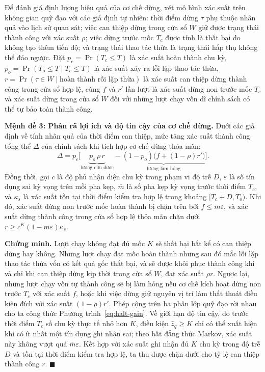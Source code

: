 Để đánh giá định lượng hiệu quả của cơ chế dừng, xét mô hình xác suất trên không gian quỹ đạo với các giả định tự nhiên: thời điểm dừng $\tau$ phụ thuộc nhân quả vào lịch sử quan sát; việc can thiệp dừng trong cửa sổ $W$ giữ được trạng thái thành công với xác suất $\rho$; việc dừng trước mốc $T_c$ được tính là thất bại do không tạo thêm tiến độ; và trạng thái thao tác thừa là trạng thái hấp thụ không thể đảo ngược. Đặt $p_c = \Pr(T_c \le T)$ là xác suất hoàn thành chu kỳ, $p_o = \Pr(T_o \le T \mid T_c \le T)$ là xác suất xảy ra lỗi lặp thao tác thừa, $r = \Pr(\tau \in W \mid \text{hoàn thành rồi lặp thừa})$ là xác suất can thiệp dừng thành công trong cửa sổ hợp lệ, cùng $f$ và $r'$ lần lượt là xác suất dừng non trước mốc $T_c$ và xác suất dừng trong cửa sổ $W$ đối với những lượt chạy vốn dĩ chính sách có thể tự bảo toàn thành công.

\textbf{Mệnh đề 3: Phân rã lợi ích và độ tin cậy của cơ chế dừng.} Dưới các giả định về tính nhân quả của thời điểm can thiệp, mức tăng xác suất thành công tổng thể $\Delta$ của chính sách khi tích hợp cơ chế dừng thỏa mãn:
\begin{equation}
\Delta = p_c \Big[ \underbrace{p_o\,\rho\,r}_{\text{lượng cứu được}} - \underbrace{(1 - p_o)\big(f + (1 - \rho)r'\big)}_{\text{lượng làm hỏng}} \Big].
\label{eq:halt-gain}
\end{equation}
Đồng thời, gọi $c$ là độ phủ nhận diện chu kỳ trong phạm vi độ trễ $D$, $\varepsilon$ là số tín dụng sai kỳ vọng trên mỗi pha kẹp, $\bar m$ là số pha kẹp kỳ vọng trước thời điểm $T_c$, và $\kappa_s$ là xác suất tồn tại thời điểm kiểm tra hợp lệ trong khoảng $[T_c + D, T_o)$. Khi đó, xác suất dừng non trước mốc hoàn thành bị chặn trên bởi $f \le \bar m \varepsilon$, và xác suất dừng thành công trong cửa sổ hợp lệ thỏa mãn chặn dưới $r \ge c^K (1 - \bar m \varepsilon) \kappa_s$.

\textbf{Chứng minh.} Lượt chạy không đạt đủ mốc $K$ sẽ thất bại bất kể có can thiệp dừng hay không. Những lượt chạy đạt mốc hoàn thành nhưng sau đó mắc lỗi lặp thao tác thừa vốn có kết quả gốc thất bại, và sẽ được khôi phục thành công khi và chỉ khi can thiệp dừng kịp thời trong cửa sổ $W$, đạt xác suất $\rho r$. Ngược lại, những lượt chạy vốn tự thành công sẽ bị làm hỏng nếu cơ chế kích hoạt dừng non trước $T_c$ với xác suất $f$, hoặc khi việc dừng giữ nguyên vị trí làm thất thoát điều kiện đích với xác suất $(1 - \rho)r'$. Phép cộng trên ba phân lớp quỹ đạo rời nhau cho ta công thức Phương trình~\eqref{eq:halt-gain}. Về giới hạn độ tin cậy, do trước thời điểm $T_c$ số chu kỳ thực tế nhỏ hơn $K$, điều kiện $\hat z_q \ge K$ chỉ có thể xuất hiện khi có ít nhất một tín dụng ghi nhận sai; theo bất đẳng thức Markov, xác suất này không vượt quá $\bar m \varepsilon$. Kết hợp với xác suất ghi nhận đủ $K$ chu kỳ trong độ trễ $D$ và tồn tại thời điểm kiểm tra hợp lệ, ta thu được chặn dưới cho tỷ lệ can thiệp thành công $r$. $\blacksquare$

